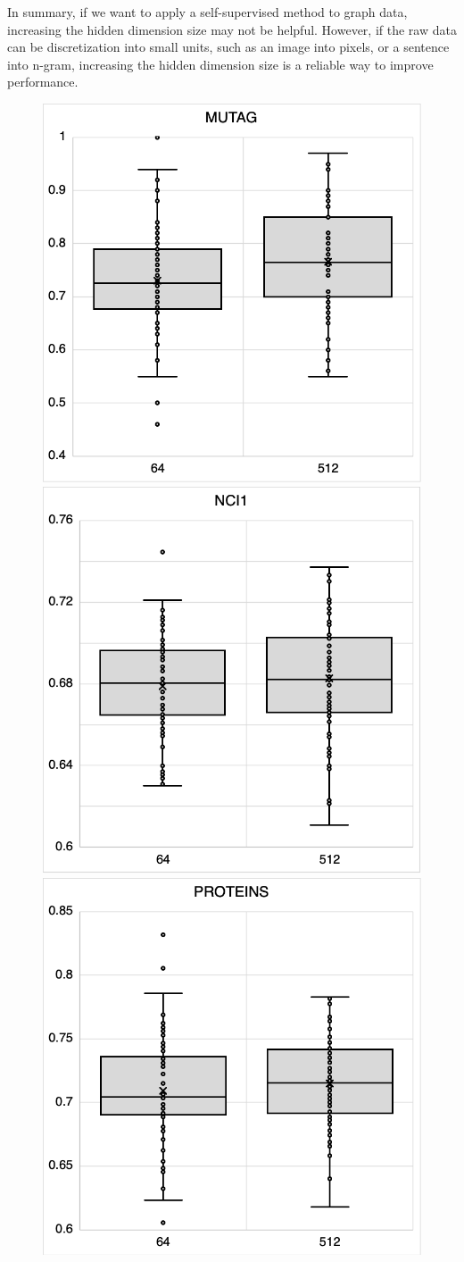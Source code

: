 In summary, if we want to apply a self-supervised method to graph data, increasing the hidden dimension size may not be helpful. However, if the raw data can be discretization into small units, such as an image into pixels, or a sentence into n-gram, increasing the hidden dimension size is a reliable way to improve performance. 


\begin{figure}[htbp]
\centering
{}
    {%
        \includegraphics[width = .48\linewidth]{./figures/5-MUTAG.png}\quad
        \includegraphics[width = .48\linewidth]{./figures/5-NCI1.png}}
    {%
        \includegraphics[width = .48\linewidth]{./figures/5-PROTEINS.png}\quad
}
\end{figure}
